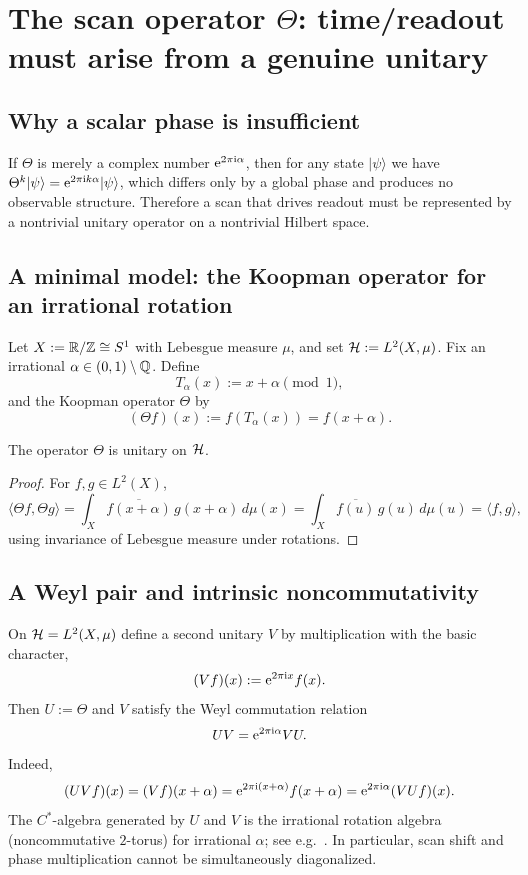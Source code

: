 \section{The scan operator \texorpdfstring{$\Theta$}{Theta}: time/readout must arise from a genuine unitary}
\label{sec:theta}

\subsection{Why a scalar phase is insufficient}
If $\Theta$ is merely a complex number $\mathrm{e}^{2\pi\mathrm{i}\alpha}$, then for any state $|\psi\rangle$ we have $\Theta^k|\psi\rangle=\mathrm{e}^{2\pi\mathrm{i} k\alpha}|\psi\rangle$, which differs only by a global phase and produces no observable structure. Therefore a scan that drives readout must be represented by a nontrivial unitary operator on a nontrivial Hilbert space.

\subsection{A minimal model: the Koopman operator for an irrational rotation}
Let $X:=\mathbb{R}/\mathbb{Z}\cong S^1$ with Lebesgue measure $\mu$, and set $\mathcal{H}:=L^2(X,\mu)$. Fix an irrational $\alpha\in(0,1)\setminus\mathbb{Q}$. Define
$$
T_\alpha(x):=x+\alpha\pmod{1},
$$
and the Koopman operator $\Theta$ by
$$
(\Theta f)(x):=f(T_\alpha(x))=f(x+\alpha).
$$

\begin{proposition}[Unitarity]
\label{prop:theta_unitary}
The operator $\Theta$ is unitary on $\mathcal{H}$.
\end{proposition}

\begin{proof}
For $f,g\in L^2(X)$,
$$
\langle \Theta f,\Theta g\rangle=\int_X \overline{f(x+\alpha)}\,g(x+\alpha)\,d\mu(x)=\int_X \overline{f(u)}\,g(u)\,d\mu(u)=\langle f,g\rangle,
$$
using invariance of Lebesgue measure under rotations.
\end{proof}

\subsection{A Weyl pair and intrinsic noncommutativity}
\label{subsec:weyl_pair}
On $\mathcal{H}=L^2(X,\mu)$ define a second unitary $V$ by multiplication with the basic character,
$$
(Vf)(x):=\mathrm{e}^{2\pi\mathrm{i} x} f(x).
$$
Then $U:=\Theta$ and $V$ satisfy the Weyl commutation relation
$$
UV=\mathrm{e}^{2\pi\mathrm{i}\alpha}VU.
$$
Indeed,
$$
(UVf)(x)=(Vf)(x+\alpha)=\mathrm{e}^{2\pi\mathrm{i}(x+\alpha)}f(x+\alpha)=\mathrm{e}^{2\pi\mathrm{i}\alpha}(VUf)(x).
$$
The $C^*$-algebra generated by $U$ and $V$ is the irrational rotation algebra (noncommutative $2$-torus) for irrational $\alpha$; see e.g.~\cite{Rieffel1981,Connes1994}. In particular, scan shift and phase multiplication cannot be simultaneously diagonalized.

